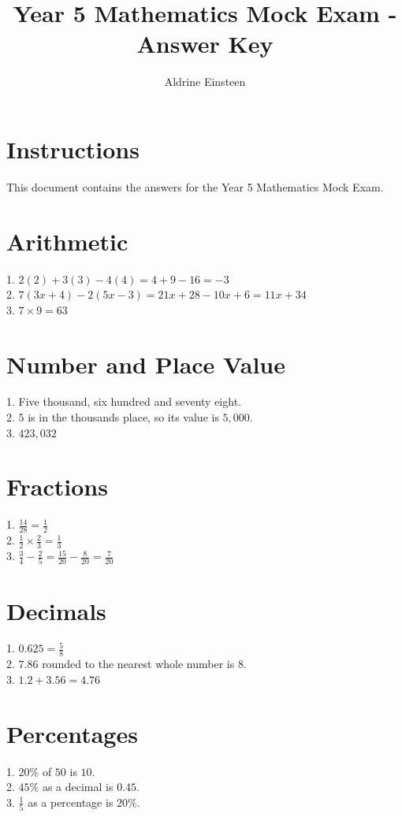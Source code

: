 \documentclass{article}
\title{Year 5 Mathematics Mock Exam - Answer Key}
\author{Aldrine Einsteen}
\date{}
\begin{document}
\maketitle

\section*{Instructions}
This document contains the answers for the Year 5 Mathematics Mock Exam. 

\section{Arithmetic}
1. $2(2) + 3(3) - 4(4) = 4 + 9 - 16 = -3$ \\
2. $7(3x+4)-2(5x-3) = 21x + 28 - 10x + 6 = 11x + 34$ \\
3. $7 \times 9 = 63$ \\

\section{Number and Place Value}
1. Five thousand, six hundred and seventy eight. \\
2. $5$ is in the thousands place, so its value is $5,000$. \\
3. $423,032$ \\

\section{Fractions}
1. $\frac{14}{28} = \frac{1}{2}$ \\
2. $\frac{1}{2} \times \frac{2}{3} = \frac{1}{3}$ \\
3. $\frac{3}{4} - \frac{2}{5} = \frac{15}{20} - \frac{8}{20} = \frac{7}{20}$ \\

\section{Decimals}
1. $0.625 = \frac{5}{8}$ \\
2. $7.86$ rounded to the nearest whole number is $8$. \\
3. $1.2 + 3.56 = 4.76$ \\

\section{Percentages}
1. $20\%$ of $50$ is $10$. \\
2. $45\%$ as a decimal is $0.45$. \\
3. $\frac{1}{5}$ as a percentage is $20\%$. \\
\end{document}
